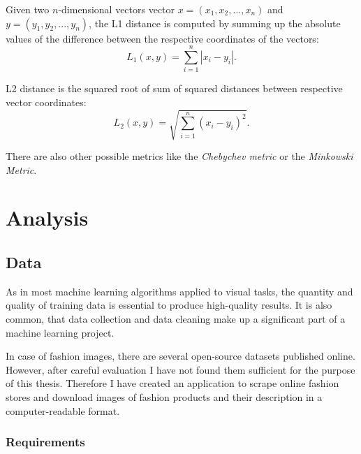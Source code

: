 \documentclass[12pt]{report}
\begin{document}
Given two $n$-dimensional vectors vector $x = (x_1, x_2, ..., x_n)$ and $y = (y_1, y_2, ..., y_n)$, the L1 distance is computed by summing up the absolute values of the difference between the respective coordinates of the vectors:
\begin{equation}
L_1(x, y) = \sum_{i=1}^{n} |x_i - y_i|.
\end{equation} 

L2 distance is the squared root of sum of squared distances between respective vector coordinates:
\begin{equation}
L_2(x, y) = \sqrt{\sum_{i=1}^{n} (x_i - y_i)^2}.
\end{equation}

There are also other possible metrics like the \textit{Chebychev metric} or the \textit{Minkowski Metric}.


\pagebreak
\chapter{Analysis}

\section{Data} \label{sec:data}
As in most machine learning algorithms applied to visual tasks, the quantity and quality of training data is essential to produce high-quality results. It is also common, that data collection and data cleaning make up a significant part of a machine learning project.

In case of fashion images, there are several open-source datasets published online. However, after careful evaluation I have not found them sufficient for the purpose of this thesis. Therefore I have created an application to scrape online fashion stores and download images of fashion products and their description in a computer-readable format.

\pagebreak
\subsection{Requirements}
\end{document}
